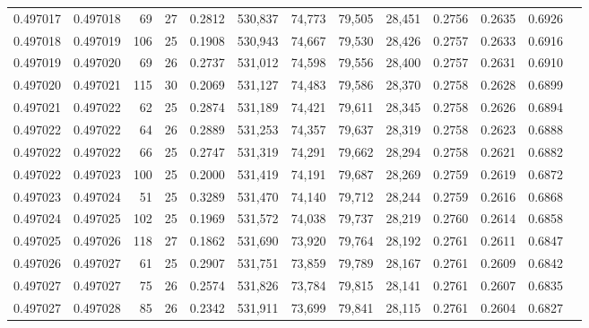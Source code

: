 \begin{tabular}{rrrrrrrrrrrrr}
0.497017 & 0.497018 &  69 &  27 &                                     0.2812 & 530,837 &  74,773 &  79,505 &  28,451 & 0.2756 & 0.2635 & 0.6926 \\
0.497018 & 0.497019 & 106 &  25 &                                     0.1908 & 530,943 &  74,667 &  79,530 &  28,426 & 0.2757 & 0.2633 & 0.6916 \\
0.497019 & 0.497020 &  69 &  26 &                                     0.2737 & 531,012 &  74,598 &  79,556 &  28,400 & 0.2757 & 0.2631 & 0.6910 \\
0.497020 & 0.497021 & 115 &  30 &                                     0.2069 & 531,127 &  74,483 &  79,586 &  28,370 & 0.2758 & 0.2628 & 0.6899 \\
0.497021 & 0.497022 &  62 &  25 &                                     0.2874 & 531,189 &  74,421 &  79,611 &  28,345 & 0.2758 & 0.2626 & 0.6894 \\
0.497022 & 0.497022 &  64 &  26 &                                     0.2889 & 531,253 &  74,357 &  79,637 &  28,319 & 0.2758 & 0.2623 & 0.6888 \\
0.497022 & 0.497022 &  66 &  25 &                                     0.2747 & 531,319 &  74,291 &  79,662 &  28,294 & 0.2758 & 0.2621 & 0.6882 \\
0.497022 & 0.497023 & 100 &  25 &                                     0.2000 & 531,419 &  74,191 &  79,687 &  28,269 & 0.2759 & 0.2619 & 0.6872 \\
0.497023 & 0.497024 &  51 &  25 &                                     0.3289 & 531,470 &  74,140 &  79,712 &  28,244 & 0.2759 & 0.2616 & 0.6868 \\
0.497024 & 0.497025 & 102 &  25 &                                     0.1969 & 531,572 &  74,038 &  79,737 &  28,219 & 0.2760 & 0.2614 & 0.6858 \\
0.497025 & 0.497026 & 118 &  27 &                                     0.1862 & 531,690 &  73,920 &  79,764 &  28,192 & 0.2761 & 0.2611 & 0.6847 \\
0.497026 & 0.497027 &  61 &  25 &                                     0.2907 & 531,751 &  73,859 &  79,789 &  28,167 & 0.2761 & 0.2609 & 0.6842 \\
0.497027 & 0.497027 &  75 &  26 &                                     0.2574 & 531,826 &  73,784 &  79,815 &  28,141 & 0.2761 & 0.2607 & 0.6835 \\
0.497027 & 0.497028 &  85 &  26 &                                     0.2342 & 531,911 &  73,699 &  79,841 &  28,115 & 0.2761 & 0.2604 & 0.6827 \\

\end{tabular}

